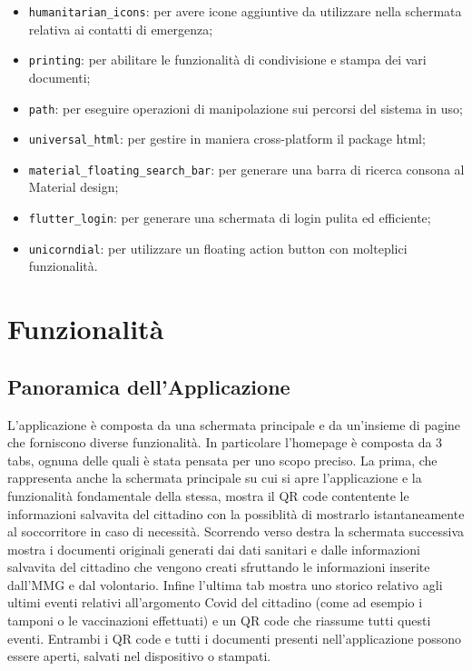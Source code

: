 \documentclass[12pt,a4paper,twoside,openright,titlepage]{book}
\begin{document}
\begin{itemize}
\item \texttt{humanitarian\_icons}: per avere icone aggiuntive da utilizzare nella schermata relativa ai contatti di emergenza;
\item \texttt{printing}: per abilitare le funzionalità di condivisione e stampa dei vari documenti;
\item \texttt{path}: per eseguire operazioni di manipolazione sui percorsi del sistema in uso;
\item \texttt{universal\_html}: per gestire in maniera cross-platform il package html;
\item \texttt{material\_floating\_search\_bar}: per generare una barra di ricerca consona al Material design;
\item \texttt{flutter\_login}: per generare una schermata di login pulita ed efficiente;
\item \texttt{unicorndial}: per utilizzare un floating action button con molteplici funzionalità.
\end{itemize}


\chapter{Funzionalità}
\section{Panoramica dell'Applicazione}
L'applicazione è composta da una schermata principale e da un'insieme di pagine che forniscono diverse funzionalità. In particolare l'homepage è composta da 3 tabs, ognuna delle quali è stata pensata per uno scopo preciso. La prima, che rappresenta anche la schermata principale su cui si apre l'applicazione e la funzionalità fondamentale della stessa, mostra il QR code contentente le informazioni salvavita del cittadino con la possiblità di mostrarlo istantaneamente al soccorritore in caso di necessità. Scorrendo verso destra la schermata successiva mostra i documenti originali generati dai dati sanitari e dalle informazioni salvavita del cittadino che vengono creati sfruttando le informazioni inserite dall'MMG e dal volontario. Infine l'ultima tab mostra uno storico relativo agli ultimi eventi relativi all'argomento Covid del cittadino (come ad esempio i tamponi o le vaccinazioni effettuati) e un QR code che riassume tutti questi eventi. Entrambi i QR code e tutti i documenti presenti nell'applicazione possono essere aperti, salvati nel dispositivo o stampati.\newline
\end{document}
